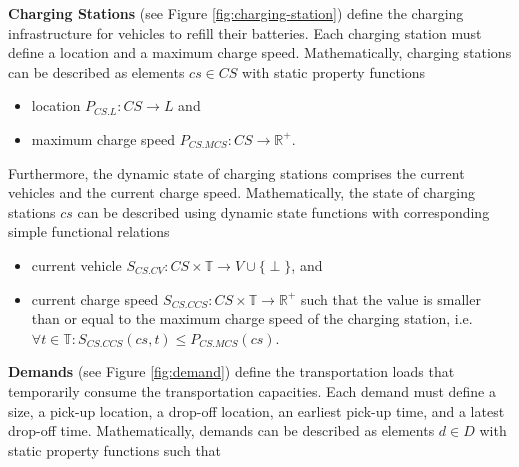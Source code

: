 \documentclass[graybox]{svmult}
\begin{document}
\noindent
\textbf{Charging Stations} (see Figure \ref{fig:charging-station})
define the charging infrastructure for vehicles to refill their batteries.
Each charging station must define a location and a maximum charge speed.
Mathematically, charging stations can be described as elements $cs \in CS$ with static property functions
\begin{itemize}
	\item location $P_{CS.L}: CS \rightarrow L$ and
	\item maximum charge speed $P_{CS.MCS}: CS \rightarrow \mathbb{R}^+$.
\end{itemize}
Furthermore, the dynamic state of charging stations comprises the current vehicles and the current charge speed.
Mathematically, the state of charging stations $cs$ can be described using dynamic state functions with corresponding simple functional relations
\begin{itemize}
	\item current vehicle $S_{CS.CV}: CS \times \mathbb{T} \rightarrow V \cup \{\perp\}$, and
	\item current charge speed $S_{CS.CCS}: CS \times \mathbb{T} \rightarrow \mathbb{R}^+$ such that the value is smaller than or equal to the maximum charge speed of the charging station, i.e.\ $\forall t \in \mathbb{T}: S_{CS.CCS}(cs,t) \leq P_{CS.MCS}(cs)$.
\end{itemize}

\vspace{2mm}
\noindent
\textbf{Demands} (see Figure \ref{fig:demand})
 define the transportation loads that temporarily consume the transportation capacities.
Each demand must define a size, a pick-up location, a drop-off location, an earliest pick-up time, and a latest drop-off time.
Mathematically, demands can be described as elements $d \in D$ with static property functions such that
\end{document}
